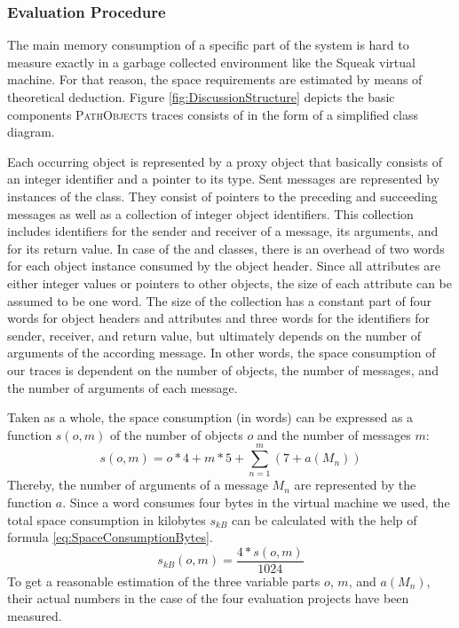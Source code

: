 \subsubsection{Evaluation Procedure}
The main memory consumption of a specific part of the system is hard to measure exactly in a garbage collected environment like the Squeak virtual machine.
For that reason, the space requirements are estimated by means of theoretical deduction.
Figure \ref{fig:DiscussionStructure} depicts the basic components \textsc{PathObjects} traces consists of in the form of a simplified class diagram.

Each occurring object is represented by a proxy object that basically consists of an integer identifier and a pointer to its type.
Sent messages are represented by instances of the  class.
They consist of pointers to the preceding and succeeding messages as well as a collection of integer object identifiers.
This collection includes identifiers for the sender and receiver of a message, its arguments, and for its return value.
In case of the  and  classes, there is an overhead of two words for each object instance consumed by the object header.
Since all attributes are either integer values or pointers to other objects, the size of each attribute can be assumed to be one word.
The size of the  collection has a constant part of four words for object headers and attributes and three words for the identifiers for sender, receiver, and return value, but ultimately depends on the number of arguments of the according message.
In other words, the space consumption of our traces is dependent on the number of objects, the number of messages, and the number of arguments of each message.

Taken as a whole, the space consumption (in words) can be expressed as a function $s(o,m)$ of the number of objects $o$ and the number of messages $m$:
\begin{equation}
s(o,m)=o*4 + m*5 + \sum_{n=1}^{m} (7 + a(M_n))\label{eq:SpaceConsumptionWords}
\end{equation}
Thereby, the number of arguments of a message $M_n$ are represented by the function $a$.
Since a word consumes four bytes in the virtual machine we used, the total space consumption in kilobytes $s_{kB}$ can be calculated with the help of formula \ref{eq:SpaceConsumptionBytes}. 
\begin{equation}
s_{kB}(o,m) = \frac{4 * s(o,m)}{1024}\label{eq:SpaceConsumptionBytes}
\end{equation}
To get a reasonable estimation of the three variable parts $o$, $m$, and $a(M_n)$, their actual numbers in the case of the four evaluation projects have been measured.

